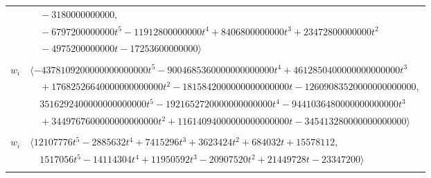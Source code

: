 \documentclass[11pt]{article}
\begin{document}
\begin{longtable}{@{}ll@{}}
 & $\quad -3180000000000,$\\
 & $\quad -6797200000000t^{5}-11912800000000t^{4}+8406800000000t^{3}+23472800000000t^{2}$\\
 & $\quad -4975200000000t-17253600000000\rangle$\\
\addlinespace[2pt]
\multicolumn{2}{@{}p{0.97\textwidth}@{}}{$i=25$, $D_i=5000000000000$, $\rho_{ij}$: $1{:}2, \allowbreak 2{:}1, \allowbreak 3{:}3, \allowbreak 4{:}3, \allowbreak 5{:}1, \allowbreak 6{:}3, \allowbreak 12{:}1, \allowbreak 13{:}2, \allowbreak 16{:}3, \allowbreak 19{:}2, \allowbreak 20{:}1, \allowbreak 31{:}1, \allowbreak 32{:}3, \allowbreak 35{:}3, \allowbreak 39{:}3, \allowbreak 45{:}3, \allowbreak 47{:}3, \allowbreak 52{:}2, \allowbreak 54{:}2, \allowbreak 61{:}3, \allowbreak 64{:}1, \allowbreak 69{:}3, \allowbreak 71{:}2, \allowbreak 77{:}1, \allowbreak 78{:}1, \allowbreak 80{:}2$}\\
$w_i$ & $\langle -4378109200000000000000t^{5}-9004685360000000000000t^{4}+4612850400000000000000t^{3}$\\
 & $\quad +17682526640000000000000t^{2}-1815842000000000000000t-12609083520000000000000,$\\
 & $\quad 3516292400000000000000t^{5}-1921652720000000000000t^{4}-9441036480000000000000t^{3}$\\
 & $\quad +3449767600000000000000t^{2}+11614094000000000000000t-345413280000000000000\rangle$\\
\addlinespace[2pt]
\multicolumn{2}{@{}p{0.97\textwidth}@{}}{$i=26$, $D_i=1$, $\rho_{ij}$: $1{:}3, \allowbreak 2{:}1, \allowbreak 5{:}3, \allowbreak 14{:}3, \allowbreak 21{:}3, \allowbreak 24{:}2, \allowbreak 27{:}3, \allowbreak 28{:}3, \allowbreak 29{:}3, \allowbreak 31{:}3, \allowbreak 34{:}2, \allowbreak 35{:}3, \allowbreak 36{:}2, \allowbreak 41{:}3, \allowbreak 43{:}3, \allowbreak 44{:}1, \allowbreak 46{:}3, \allowbreak 54{:}3, \allowbreak 55{:}3, \allowbreak 58{:}1, \allowbreak 59{:}3, \allowbreak 62{:}3, \allowbreak 64{:}2, \allowbreak 65{:}2, \allowbreak 66{:}1, \allowbreak 67{:}1, \allowbreak 68{:}3, \allowbreak 69{:}2, \allowbreak 71{:}1, \allowbreak 73{:}3, \allowbreak 79{:}3$}\\
$w_i$ & $\langle 12107776t^{5}-2885632t^{4}+7415296t^{3}+3623424t^{2}+684032t+15578112,$\\
 & $\quad 1517056t^{5}-14114304t^{4}+11950592t^{3}-20907520t^{2}+21449728t-23347200\rangle$\\
\addlinespace[2pt]
\multicolumn{2}{@{}p{0.97\textwidth}@{}}{$i=27$, $D_i=128$, $\rho_{ij}$: $5{:}2, \allowbreak 26{:}1, \allowbreak 29{:}2, \allowbreak 31{:}2, \allowbreak 38{:}1, \allowbreak 43{:}3, \allowbreak 45{:}2, \allowbreak 46{:}1, \allowbreak 50{:}2, \allowbreak 55{:}2, \allowbreak 56{:}3, \allowbreak 59{:}1, \allowbreak 62{:}2, \allowbreak 69{:}1, \allowbreak 71{:}1, \allowbreak 75{:}3, \allowbreak 76{:}1, \allowbreak 79{:}1, \allowbreak 80{:}3$}\\

\end{longtable}
\end{document}
